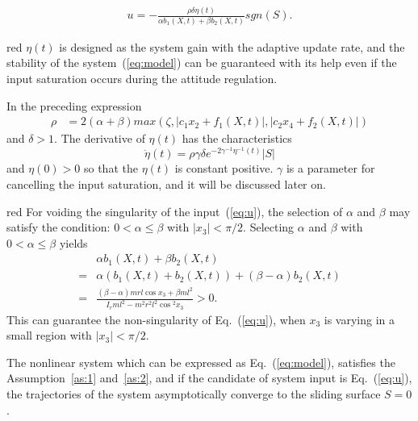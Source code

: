 \begin{align}
u = -\frac{\rho\delta\eta(t)}{\alpha b_1(X,t)+\beta b_2(X,t)}sgn(S)\label{eq:u}.
\end{align}\par
\begin{color}{red}
$\eta(t)$ is designed as the system gain with the adaptive update rate, and the stability of the system~(\ref{eq:model}) can be guaranteed with its help even if the input saturation occurs during the attitude regulation.
\end{color}
In the preceding expression
\begin{align}
\rho &= 2(\alpha+\beta)max(\zeta,\vert c_1x_2+f_1(X,t)\vert,\vert c_2x_4+f_2(X,t)\vert)
\end{align}
and $\delta>1$. The derivative of $\eta(t)$ has the characteristics $$\dot{{\eta}}(t) = \rho\gamma\delta e^{-2\gamma^{-1}{\eta}^{-1}(t)}\vert S\vert$$ and $\eta(0) > 0$ so that the $\eta(t)$ is constant positive. $\gamma$ is a parameter for cancelling the input saturation, and it will be discussed later on. \begin{color}{red}
For voiding the singularity of the input~(\ref{eq:u}), the selection of $\alpha$ and $\beta$ may satisfy the condition: $0<\alpha\le\beta$ with $\vert x_3\vert<\pi/2$.
    Selecting $\alpha$ and $\beta$ with $0<\alpha\le\beta$ yields
    \begin{align*}
    &\alpha b_1(X,t)+\beta b_2(X,t)\\
    =& \alpha(b_1(X,t)+b_2(X,t))+(\beta-\alpha)b_2(X,t)\\
    =&\frac{(\beta-\alpha)mrl\cos x_3 + \beta ml^2}{I_rml^2-m^2r^2l^2\cos{^2x_3}}>0.
    \end{align*}
    This can guarantee the non-singularity of Eq.~(\ref{eq:u}), when $x_3$ is varying in a small region with $\vert x_3\vert<\pi/2$.
\end{color}
\begin{theorem}
The nonlinear system which can be expressed as Eq.~(\ref{eq:model}), satisfies the Assumption~\ref{as:1} and~\ref{as:2}, and if the candidate of system input is Eq.~(\ref{eq:u}), the trajectories of the system asymptotically converge to the sliding surface $S = 0$.
\end{theorem}
